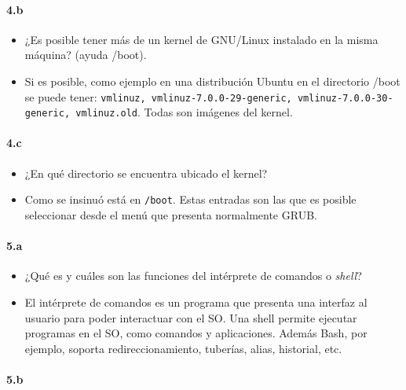 \documentclass[10pt,a4paper]{paper}
\begin{document}
	
	\paragraph{4.b}
	
	\begin{itemize}
		\item ¿Es posible tener más de un kernel de GNU/Linux instalado en la misma
		máquina? (ayuda /boot).
		
		
		\item Si es posible, como ejemplo en una distribución Ubuntu en el directorio
		/boot se puede tener: \texttt{vmlinuz, vmlinuz-7.0.0-29-generic,
			vmlinuz-7.0.0-30-generic, vmlinuz.old}. Todas son imágenes del kernel.
	\end{itemize}
	
	
	\paragraph{4.c}
	
	\begin{itemize}
		\item ¿En qué directorio se encuentra ubicado el kernel?
		
		
		\item Como se insinuó está en \texttt{/boot}. Estas entradas son las que es
		posible seleccionar desde el menú que presenta normalmente GRUB.
	\end{itemize}
	
	
	
	\paragraph{5.a}
	
	\begin{itemize}
		\item ¿Qué es y cuáles son las funciones del intérprete de comandos o
		\textit{shell}?
		
		
		\item El intérprete de comandos es un programa que presenta una interfaz al
		usuario para poder interactuar con el SO. Una shell permite ejecutar programas
		en el SO, como comandos y aplicaciones. Además Bash, por ejemplo, soporta
		redireccionamiento, tuberías, alias, historial, etc.
	\end{itemize}
	
	\paragraph{5.b}
	
\end{document}

